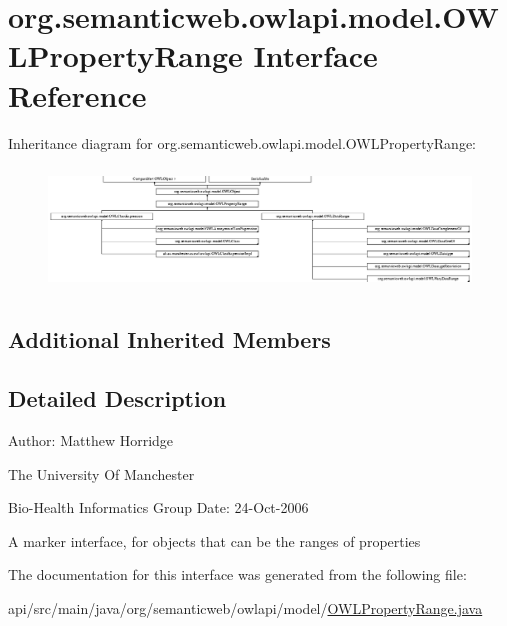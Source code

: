 \hypertarget{interfaceorg_1_1semanticweb_1_1owlapi_1_1model_1_1_o_w_l_property_range}{\section{org.\-semanticweb.\-owlapi.\-model.\-O\-W\-L\-Property\-Range Interface Reference}
\label{interfaceorg_1_1semanticweb_1_1owlapi_1_1model_1_1_o_w_l_property_range}
}
Inheritance diagram for org.\-semanticweb.\-owlapi.\-model.\-O\-W\-L\-Property\-Range\-:\begin{figure}[H]
\begin{center}
\leavevmode
\includegraphics[height=3.289817cm]{interfaceorg_1_1semanticweb_1_1owlapi_1_1model_1_1_o_w_l_property_range}
\end{center}
\end{figure}
\subsection*{Additional Inherited Members}


\subsection{Detailed Description}
Author\-: Matthew Horridge\par
 The University Of Manchester\par
 Bio-\/\-Health Informatics Group Date\-: 24-\/\-Oct-\/2006

A marker interface, for objects that can be the ranges of properties 

The documentation for this interface was generated from the following file\-:\begin{DoxyCompactItemize}
\item 
api/src/main/java/org/semanticweb/owlapi/model/\hyperlink{_o_w_l_property_range_8java}{O\-W\-L\-Property\-Range.\-java}\end{DoxyCompactItemize}
